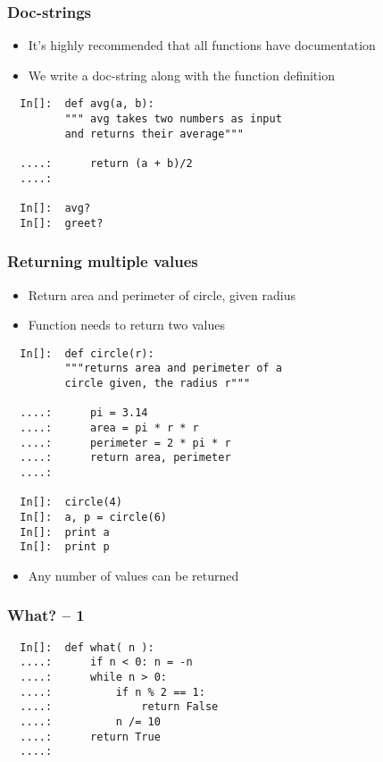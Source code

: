 \begin{frame}[fragile]
  \frametitle{Doc-strings}
  \begin{itemize}
  \item It's highly recommended that all functions have documentation
  \item We write a doc-string along with the function definition
  \end{itemize}
  \begin{lstlisting}
  In[]:  def avg(a, b):
         """ avg takes two numbers as input 
         and returns their average"""

  ....:      return (a + b)/2
  ....:
        
  In[]:  avg?
  In[]:  greet?
  \end{lstlisting}
\end{frame}

\begin{frame}[fragile]
  \frametitle{Returning multiple values}
  \begin{itemize}
  \item Return area and perimeter of circle, given radius
  \item Function needs to return two values
  \end{itemize}
  \begin{lstlisting}
  In[]:  def circle(r):
         """returns area and perimeter of a 
         circle given, the radius r"""

  ....:      pi = 3.14
  ....:      area = pi * r * r
  ....:      perimeter = 2 * pi * r
  ....:      return area, perimeter
  ....:

  In[]:  circle(4)
  In[]:  a, p = circle(6)
  In[]:  print a
  In[]:  print p
  \end{lstlisting}
  \begin{itemize}
  \item Any number of values can be returned
  \end{itemize}
\end{frame}

\begin{frame}[fragile]
  \frametitle{What? -- 1}
  \begin{lstlisting}       
  In[]:  def what( n ):           
  ....:      if n < 0: n = -n     
  ....:      while n > 0:         
  ....:          if n % 2 == 1:   
  ....:              return False 
  ....:          n /= 10          
  ....:      return True          
  ....:
  \end{lstlisting}         
\end{frame}

